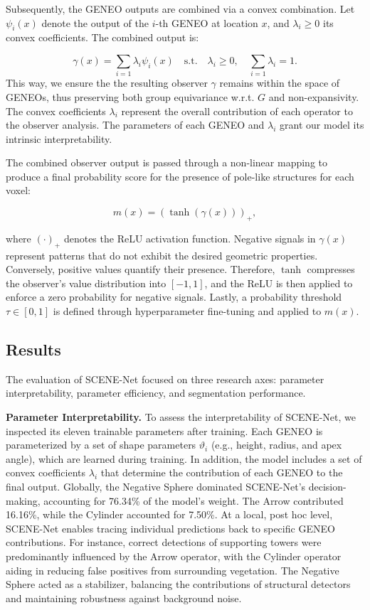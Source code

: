 Subsequently, the GENEO outputs are combined via a convex combination. Let
$\psi_i(x)$ denote the output of the $i$-th GENEO at location $x$, and
$\lambda_i \geq 0$ its convex coefficients. The combined output is:

\begin{equation}
      \gamma(x) = \sum_{i=1} \lambda_i \psi_i(x) \quad \text{s.t.} \quad \lambda_i \geq 0, \quad \sum_{i=1} \lambda_i = 1.
\end{equation}
%
This way, we ensure the the resulting observer $\gamma$ remains within the
space of GENEOs, thus preserving both group equivariance w.r.t. $G$ and
non-expansivity. The convex coefficients $\lambda_i$ represent the overall
contribution of each operator to the observer analysis. The parameters of each
GENEO and $\lambda_i$ grant our model its intrinsic interpretability.

The combined observer output is passed through a non-linear mapping to produce
a final probability score for the presence of pole-like structures for each
voxel:

\begin{equation}
      m(x) = {\left(\tanh(\gamma(x))\right)}_+,
\end{equation}

where ${(\cdot)}_+$ denotes the ReLU activation function.
%
Negative signals in $\gamma(x)$ represent patterns that do not exhibit the
desired geometric properties. Conversely, positive values quantify their
presence. Therefore, $\tanh$ compresses the observer’s value distribution into
$[-1, 1]$, and the ReLU is then applied to enforce a zero probability for
negative signals. Lastly, a probability threshold $\tau \in [0, 1]$ is defined
through hyperparameter fine-tuning and applied to $m(x)$.

\subsection{Results}

The evaluation of SCENE-Net focused on three research axes: parameter
interpretability, parameter efficiency, and segmentation performance.

\textbf{Parameter Interpretability.} \;
To assess the interpretability of SCENE-Net, we inspected its eleven trainable
parameters after training.
%
Each GENEO is parameterized by a set of shape parameters $\vartheta_i$ (e.g.,
height, radius, and apex angle), which are learned during training.
%
In addition, the model includes a set of convex coefficients $\lambda_i$ that
determine the contribution of each GENEO to the final output.
%
Globally, the Negative Sphere dominated SCENE-Net's decision-making, accounting
for 76.34\% of the model’s weight. The Arrow contributed 16.16\%, while the
Cylinder accounted for 7.50\%.
%
At a local, post hoc level, SCENE-Net enables tracing individual predictions
back to specific GENEO contributions. For instance, correct detections of
supporting towers were predominantly influenced by the Arrow operator, with the
Cylinder operator aiding in reducing false positives from surrounding
vegetation. The Negative Sphere acted as a stabilizer, balancing the
contributions of structural detectors and maintaining robustness against
background noise.

